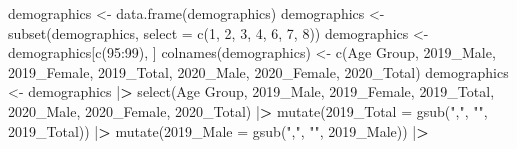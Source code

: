 \documentclass[
]{article}
\newenvironment{Shaded}{\begin{snugshade}}{\end{snugshade}}
\newcommand{\AttributeTok}[1]{\textcolor[rgb]{0.77,0.63,0.00}{#1}}
\newcommand{\DecValTok}[1]{\textcolor[rgb]{0.00,0.00,0.81}{#1}}
\newcommand{\ErrorTok}[1]{\textcolor[rgb]{0.64,0.00,0.00}{\textbf{#1}}}
\newcommand{\FunctionTok}[1]{\textcolor[rgb]{0.00,0.00,0.00}{#1}}
\newcommand{\NormalTok}[1]{#1}
\newcommand{\OtherTok}[1]{\textcolor[rgb]{0.56,0.35,0.01}{#1}}
\newcommand{\SpecialCharTok}[1]{\textcolor[rgb]{0.00,0.00,0.00}{#1}}
\newcommand{\StringTok}[1]{\textcolor[rgb]{0.31,0.60,0.02}{#1}}
\begin{document}
\begin{Shaded}
\begin{Highlighting}[]
\NormalTok{demographics }\OtherTok{\textless{}{-}} \FunctionTok{data.frame}\NormalTok{(demographics)}
\NormalTok{demographics }\OtherTok{\textless{}{-}} \FunctionTok{subset}\NormalTok{(demographics, }\AttributeTok{select =} \FunctionTok{c}\NormalTok{(}\DecValTok{1}\NormalTok{, }\DecValTok{2}\NormalTok{, }\DecValTok{3}\NormalTok{, }\DecValTok{4}\NormalTok{, }\DecValTok{6}\NormalTok{, }\DecValTok{7}\NormalTok{, }\DecValTok{8}\NormalTok{))}
\NormalTok{demographics }\OtherTok{\textless{}{-}}\NormalTok{ demographics[}\FunctionTok{c}\NormalTok{(}\DecValTok{95}\SpecialCharTok{:}\DecValTok{99}\NormalTok{), ]}
\FunctionTok{colnames}\NormalTok{(demographics) }\OtherTok{\textless{}{-}} \FunctionTok{c}\NormalTok{(}\StringTok{\textquotesingle{}Age Group\textquotesingle{}}\NormalTok{, }\StringTok{\textquotesingle{}2019\_Male\textquotesingle{}}\NormalTok{, }\StringTok{\textquotesingle{}2019\_Female\textquotesingle{}}\NormalTok{, }\StringTok{\textquotesingle{}2019\_Total\textquotesingle{}}\NormalTok{, }\StringTok{\textquotesingle{}2020\_Male\textquotesingle{}}\NormalTok{, }\StringTok{\textquotesingle{}2020\_Female\textquotesingle{}}\NormalTok{, }\StringTok{\textquotesingle{}2020\_Total\textquotesingle{}}\NormalTok{)}
\NormalTok{demographics }\OtherTok{\textless{}{-}} 
\NormalTok{  demographics }\SpecialCharTok{|}\ErrorTok{\textgreater{}}
  \FunctionTok{select}\NormalTok{(}\StringTok{\textasciigrave{}}\AttributeTok{Age Group}\StringTok{\textasciigrave{}}\NormalTok{, }\StringTok{\textasciigrave{}}\AttributeTok{2019\_Male}\StringTok{\textasciigrave{}}\NormalTok{, }\StringTok{\textasciigrave{}}\AttributeTok{2019\_Female}\StringTok{\textasciigrave{}}\NormalTok{, }\StringTok{\textasciigrave{}}\AttributeTok{2019\_Total}\StringTok{\textasciigrave{}}\NormalTok{, }\StringTok{\textasciigrave{}}\AttributeTok{2020\_Male}\StringTok{\textasciigrave{}}\NormalTok{, }\StringTok{\textasciigrave{}}\AttributeTok{2020\_Female}\StringTok{\textasciigrave{}}\NormalTok{, }\StringTok{\textasciigrave{}}\AttributeTok{2020\_Total}\StringTok{\textasciigrave{}}\NormalTok{) }\SpecialCharTok{|}\ErrorTok{\textgreater{}}
  \FunctionTok{mutate}\NormalTok{(}\StringTok{\textasciigrave{}}\AttributeTok{2019\_Total}\StringTok{\textasciigrave{}} \OtherTok{=} \FunctionTok{gsub}\NormalTok{(}\StringTok{","}\NormalTok{, }\StringTok{""}\NormalTok{, }\StringTok{\textasciigrave{}}\AttributeTok{2019\_Total}\StringTok{\textasciigrave{}}\NormalTok{)) }\SpecialCharTok{|}\ErrorTok{\textgreater{}}
  \FunctionTok{mutate}\NormalTok{(}\StringTok{\textasciigrave{}}\AttributeTok{2019\_Male}\StringTok{\textasciigrave{}} \OtherTok{=} \FunctionTok{gsub}\NormalTok{(}\StringTok{","}\NormalTok{, }\StringTok{""}\NormalTok{, }\StringTok{\textasciigrave{}}\AttributeTok{2019\_Male}\StringTok{\textasciigrave{}}\NormalTok{)) }\SpecialCharTok{|}\ErrorTok{\textgreater{}}

\end{Highlighting}
\end{Shaded}
\end{document}
